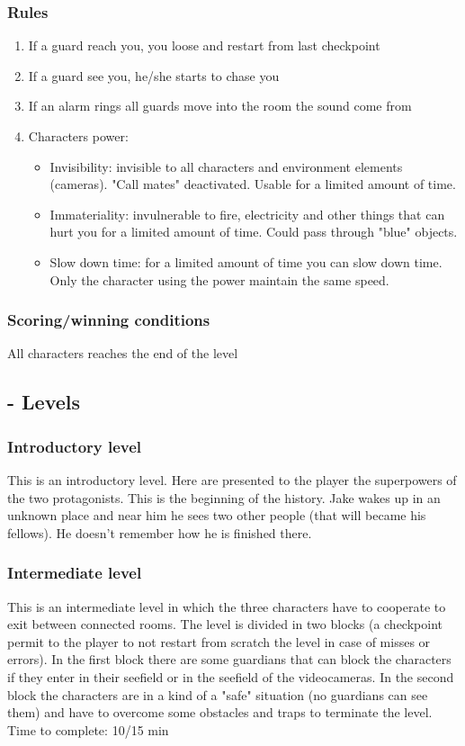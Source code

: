 \subsubsection{Rules}
\begin{enumerate}  
\item If a guard reach you, you loose and restart from last checkpoint
\item If a guard see you, he/she starts to chase you
\item If an alarm rings all guards move into the room the sound come from
\item Characters power: 	\begin{itemize}
					\item Invisibility: invisible to all characters and environment elements (cameras). "Call mates" deactivated. Usable for a limited amount of time.
					\item Immateriality: invulnerable to fire, electricity and other things that can hurt you for a limited amount of time. Could pass through "blue" objects.
					\item Slow down time: for a limited amount of time you can slow down time. Only the character using the power maintain the same speed. 
					\end{itemize}
\end{enumerate}

\subsubsection{Scoring/winning conditions}
All characters reaches the end of the level

\subsection{- Levels}
\subsubsection{Introductory level}
This is an introductory level. Here are presented to the player the superpowers of the two protagonists.
This is the beginning of the history. Jake wakes up in an unknown place and near him he sees two other people (that will became his fellows). He doesn't remember how he is finished there.

\subsubsection{Intermediate level}
This is an intermediate level in which the three characters have to cooperate to exit between connected rooms.
The level is divided in two blocks (a checkpoint permit to the player to not restart from scratch the level in case of misses or errors).
In the first block there are some guardians that can block the characters if they enter in their seefield or in the seefield of the videocameras.
In the second block the characters are in a kind of a "safe" situation (no guardians can see them) and have to overcome some obstacles and traps to terminate the level.
Time to complete: 10/15 min

